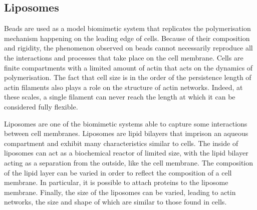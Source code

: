 \documentclass[A4paperpaper,11pt,english]{sphinxmanual}
\begin{document}
\subsection{Liposomes}
\label{index-latex:liposomes}
Beads are used as a model biomimetic system that replicates the polymerisation mechanism
happening on the leading edge of cells. Because of their composition and
rigidity, the phenomenon observed on beads cannot necessarily reproduce all the interactions and
processes that take place on the cell membrane. Cells are finite compartments with a
limited amount of actin that acts on the dynamics of polymerisation.  The fact
that cell size is in the order of the persistence length of actin filaments
also plays a role on the structure of actin networks. Indeed, at these scales, a
single filament can never reach the length at which it can be considered fully
flexible.

Liposomes are one of the biomimetic systems able to capture some
interactions between cell membranes. Liposomes are lipid bilayers that imprison
an aqueous compartment and exhibit many characteristics similar to cells.
The inside of liposomes can act as a biochemical reactor of limited size, with
the lipid bilayer acting as a separation from the outside, like the cell
membrane. The composition of the lipid layer can be varied in order to reflect
the composition of a cell membrane. In particular, it is possible to attach
proteins to the liposome membrane. Finally, the size of the liposomes can be
varied, leading to actin networks, the size and shape of which are similar to those found in
cells.
\end{document}
